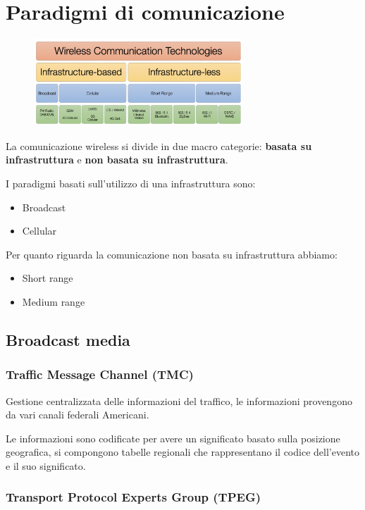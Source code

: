 \section{Paradigmi di comunicazione}

\begin{figure}
	\centering
	\includegraphics[width=0.7\textwidth]{images/paradigmi.png}
\end{figure}


La comunicazione wireless si divide in due macro categorie: \textbf{basata su infrastruttura} e
\textbf{non basata su infrastruttura}.

I paradigmi basati sull'utilizzo di una infrastruttura sono:
\begin{itemize}
	\item Broadcast
	\item Cellular
\end{itemize}

Per quanto riguarda la comunicazione non basata su infrastruttura abbiamo:
\begin{itemize}
	\item Short range
	\item Medium range
\end{itemize}


\subsection{Broadcast media}
\subsubsection{Traffic Message Channel (TMC)}

Gestione centralizzata delle informazioni del traffico, le informazioni provengono da vari canali
federali Americani.

Le informazioni sono codificate per avere un significato basato sulla posizione geografica, si
compongono tabelle regionali che rappresentano il codice dell'evento e il suo significato.


\subsubsection{Transport Protocol Experts Group (TPEG)}

